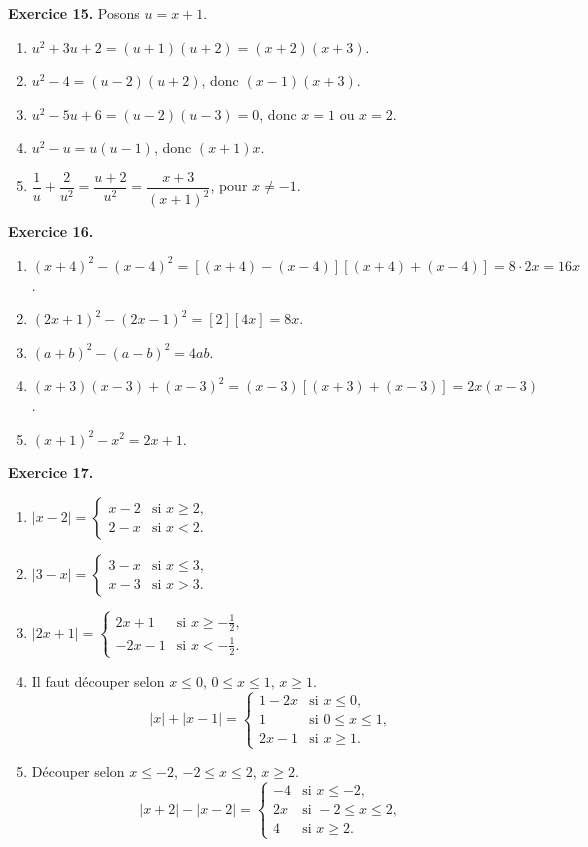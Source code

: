 \documentclass[11pt,a4paper]{article}
\begin{document}
\textbf{Exercice 15.} Posons $u=x+1$.
\begin{enumerate}[label=\alph*)]
\item $u^2+3u+2=(u+1)(u+2)=(x+2)(x+3)$.
\item $u^2-4=(u-2)(u+2)$, donc $(x-1)(x+3)$.
\item $u^2-5u+6=(u-2)(u-3)=0$, donc $x=1$ ou $x=2$.
\item $u^2-u=u(u-1)$, donc $(x+1)x$.
\item $\dfrac1u+\dfrac2{u^2}=\dfrac{u+2}{u^2}=\dfrac{x+3}{(x+1)^2}$, pour $x\neq -1$.
\end{enumerate}

\textbf{Exercice 16.}
\begin{enumerate}[label=\alph*)]
\item $(x+4)^2-(x-4)^2=[(x+4)-(x-4)] [(x+4)+(x-4)] = 8\cdot 2x=16x$.
\item $(2x+1)^2-(2x-1)^2= [2][4x]=8x$.
\item $(a+b)^2-(a-b)^2=4ab$.
\item $(x+3)(x-3)+(x-3)^2=(x-3)[(x+3)+(x-3)]=2x(x-3)$.
\item $(x+1)^2-x^2=2x+1$.
\end{enumerate}

\textbf{Exercice 17.}
\begin{enumerate}[label=\alph*)]
\item $|x-2|=\begin{cases}x-2&\text{si }x\ge 2,\\2-x&\text{si }x<2.\end{cases}$
\item $|3-x|=\begin{cases}3-x&\text{si }x\le 3,\\x-3&\text{si }x>3.\end{cases}$
\item $|2x+1|=\begin{cases}2x+1&\text{si }x\ge -\frac12,\\-2x-1&\text{si }x< -\frac12.\end{cases}$
\item Il faut découper selon $x\le 0$, $0\le x\le 1$, $x\ge 1$.
\[|x|+|x-1|=\begin{cases}1-2x&\text{si }x\le 0,\\1&\text{si }0\le x\le 1,\\2x-1&\text{si }x\ge 1.\end{cases}\]
\item Découper selon $x\le -2$, $-2\le x\le 2$, $x\ge 2$.
\[|x+2|-|x-2|=\begin{cases}-4&\text{si }x\le -2,\\2x&\text{si }-2\le x\le 2,\\4&\text{si }x\ge 2.\end{cases}\]
\end{enumerate}
\end{document}
